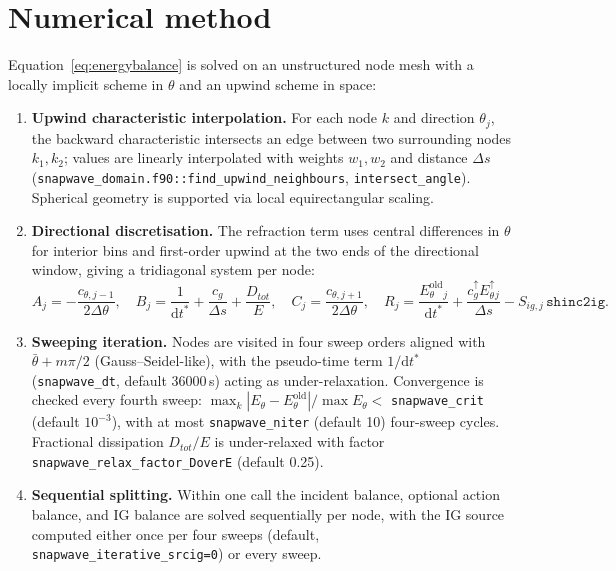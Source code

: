\documentclass[11pt,a4paper]{article}
\newcommand{\ee}{E_\theta}
\newcommand{\dd}{\mathrm{d}}
\newcommand{\code}[1]{\texttt{#1}}
\begin{document}
\section{Numerical method}
\label{sec:numerics}

Equation~\eqref{eq:energybalance} is solved on an unstructured node mesh with a
locally implicit scheme in $\theta$ and an upwind scheme in space:

\begin{enumerate}
  \item \textbf{Upwind characteristic interpolation.} For each node $k$ and
  direction $\theta_j$, the backward characteristic intersects an edge between
  two surrounding nodes $k_1,k_2$; values are linearly interpolated with weights
  $w_1,w_2$ and distance $\Delta s$ (\code{snapwave\_domain.f90::find\_upwind\_neighbours},
  \code{intersect\_angle}). Spherical geometry is supported via local
  equirectangular scaling.
  \item \textbf{Directional discretisation.} The refraction term uses central
  differences in $\theta$ for interior bins and first-order upwind at the two
  ends of the directional window, giving a tridiagonal system per node:
  \begin{equation}
  A_j=-\frac{c_{\theta,j-1}}{2\Delta\theta},\quad
  B_j=\frac{1}{\dd t^{*}}+\frac{c_g}{\Delta s}+\frac{D_{tot}}{E},\quad
  C_j=\frac{c_{\theta,j+1}}{2\Delta\theta},\quad
  R_j=\frac{\ee^{\mathrm{old}}_j}{\dd t^{*}}
      +\frac{c_g^{\uparrow}\ee^{\uparrow}_j}{\Delta s}
      -S_{ig,j}\,\code{shinc2ig}.
  \label{eq:tridiag}
  \end{equation}
  \item \textbf{Sweeping iteration.} Nodes are visited in four sweep orders
  aligned with $\bar\theta + m\pi/2$ (Gauss--Seidel-like), with the pseudo-time
  term $1/\dd t^{*}$ (\code{snapwave\_dt}, default 36000\,s) acting as
  under-relaxation. Convergence is checked every fourth sweep:
  $\max_k|\ee-\ee^{\mathrm{old}}|/\max \ee <$ \code{snapwave\_crit} (default
  $10^{-3}$), with at most \code{snapwave\_niter} (default 10) four-sweep
  cycles. Fractional dissipation $D_{tot}/E$ is under-relaxed with factor
  \code{snapwave\_relax\_factor\_DoverE} (default 0.25).
  \item \textbf{Sequential splitting.} Within one call the incident balance,
  optional action balance, and IG balance are solved sequentially per node, with
  the IG source computed either once per four sweeps (default,
  \code{snapwave\_iterative\_srcig=0}) or every sweep.
\end{enumerate}
\end{document}
